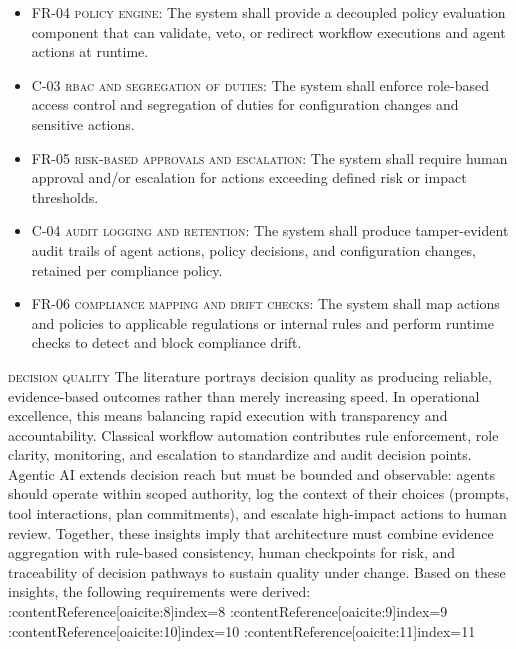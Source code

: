 \begin{itemize}
  \item \textsc{FR-04 policy engine}: The system shall provide a decoupled policy evaluation component that can validate, veto, or redirect workflow executions and agent actions at runtime.
  \item \textsc{C-03 rbac and segregation of duties}: The system shall enforce role-based access control and segregation of duties for configuration changes and sensitive actions.
  \item \textsc{FR-05 risk-based approvals and escalation}: The system shall require human approval and/or escalation for actions exceeding defined risk or impact thresholds.
  \item \textsc{C-04 audit logging and retention}: The system shall produce tamper-evident audit trails of agent actions, policy decisions, and configuration changes, retained per compliance policy.
  \item \textsc{FR-06 compliance mapping and drift checks}: The system shall map actions and policies to applicable regulations or internal rules and perform runtime checks to detect and block compliance drift.
\end{itemize}

\noindent \textsc{decision quality} \quad The literature portrays decision quality as producing reliable, evidence-based outcomes rather than merely increasing speed. In operational excellence, this means balancing rapid execution with transparency and accountability. Classical workflow automation contributes rule enforcement, role clarity, monitoring, and escalation to standardize and audit decision points. Agentic AI extends decision reach but must be bounded and observable: agents should operate within scoped authority, log the context of their choices (prompts, tool interactions, plan commitments), and escalate high-impact actions to human review. Together, these insights imply that architecture must combine evidence aggregation with rule-based consistency, human checkpoints for risk, and traceability of decision pathways to sustain quality under change. Based on these insights, the following requirements were derived: :contentReference[oaicite:8]{index=8} :contentReference[oaicite:9]{index=9} :contentReference[oaicite:10]{index=10} :contentReference[oaicite:11]{index=11}

